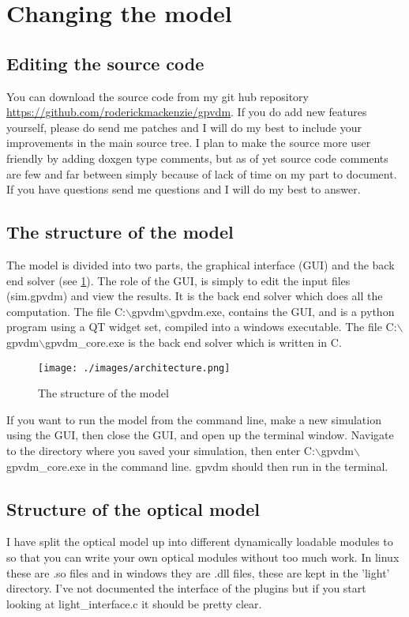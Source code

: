 \documentclass[11pt]{article}
\begin{document}
\section{Changing the model}
\subsection{Editing the source code}
You can download the source code from my git hub repository \url{https://github.com/roderickmackenzie/gpvdm}.  If you do add new features yourself, please do send me patches and I will do my best to include your improvements in the main source tree.  I plan to make the source more user friendly by adding doxgen type comments, but as of yet source code comments are few and far between simply because of lack of time on my part to document.  If you have questions send me questions and I will do my best to answer.

\subsection{The structure of the model}
The model is divided into two parts, the graphical interface (GUI) and the back end solver (see \ref{fig:structureofthemodel}).  The role of the GUI, is simply to edit the input files (sim.gpvdm) and view the results.  It is the back end solver which does all the computation.  The file C:$\backslash$gpvdm$\backslash$gpvdm.exe, contains the GUI, and is a python program using a QT widget set, compiled into a windows executable.  The file C:$\backslash$gpvdm$\backslash$gpvdm\_core.exe is the back end solver which is written in C.
\begin{figure}
\centering
\texttt{[image: ./images/architecture.png]}
\caption{The structure of the model}
\label{fig:structureofthemodel}
\end{figure}
If you want to run the model from the command line, make a new simulation using the GUI, then close the GUI, and open up the terminal window.  Navigate to the directory where you saved your simulation, then enter C:$\backslash$gpvdm$\backslash$gpvdm\_core.exe in the command line.  gpvdm should then run in the terminal.

\subsection{Structure of the optical model}
I have split the optical model up into different dynamically loadable modules to so that you can write your own optical modules without too much work.  In linux these are .so files and in windows they are .dll files, these are kept in the 'light' directory.  I've not documented the interface of the plugins but if you start looking at light\_interface.c it should be pretty clear.
\end{document}

